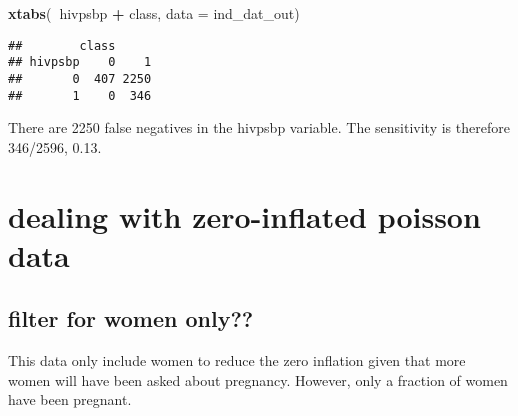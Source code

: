 \documentclass[
]{article}
\newenvironment{Shaded}{\begin{snugshade}}{\end{snugshade}}
\newcommand{\DataTypeTok}[1]{\textcolor[rgb]{0.13,0.29,0.53}{#1}}
\newcommand{\DecValTok}[1]{\textcolor[rgb]{0.00,0.00,0.81}{#1}}
\newcommand{\KeywordTok}[1]{\textcolor[rgb]{0.13,0.29,0.53}{\textbf{#1}}}
\newcommand{\NormalTok}[1]{#1}
\newcommand{\OperatorTok}[1]{\textcolor[rgb]{0.81,0.36,0.00}{\textbf{#1}}}
\newcommand{\OtherTok}[1]{\textcolor[rgb]{0.56,0.35,0.01}{#1}}
\newcommand{\StringTok}[1]{\textcolor[rgb]{0.31,0.60,0.02}{#1}}
\begin{document}
\begin{Shaded}
\end{Shaded}

\begin{Shaded}
\begin{Highlighting}[]
\KeywordTok{xtabs}\NormalTok{(}\OperatorTok{~}\NormalTok{hivpsbp }\OperatorTok{+}\StringTok{ }\NormalTok{class, }\DataTypeTok{data =}\NormalTok{ ind_dat_out)}
\end{Highlighting}
\end{Shaded}

\begin{verbatim}
##        class
## hivpsbp    0    1
##       0  407 2250
##       1    0  346
\end{verbatim}

There are 2250 false negatives in the hivpsbp variable. The sensitivity
is therefore 346/2596, 0.13.

\hypertarget{dealing-with-zero-inflated-poisson-data}{%
\section{dealing with zero-inflated poisson
data}\label{dealing-with-zero-inflated-poisson-data}}

\hypertarget{filter-for-women-only}{%
\subsection{filter for women only??}\label{filter-for-women-only}}

This data only include women to reduce the zero inflation given that
more women will have been asked about pregnancy. However, only a
fraction of women have been pregnant.

\begin{Shaded}
\end{Shaded}
\end{document}
